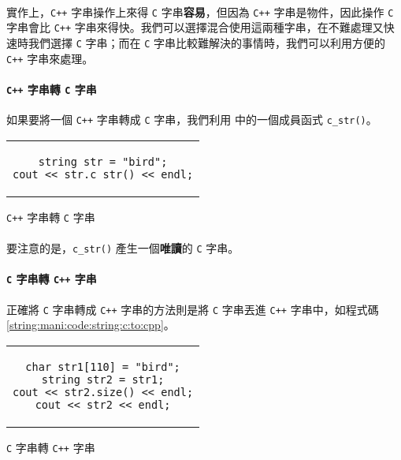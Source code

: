 \documentclass[12pt,a4paper,oneside]{article}
\begin{document}
\begin{CJK}{UTF8}{bkai}
\paragraph{}實作上，\texttt{C++} 字串操作上來得 \texttt{C} 字串\textbf{容易}，但因為 \texttt{C++} 字串是物件，因此操作 \texttt{C} 字串會比 \texttt{C++} 字串來得快。我們可以選擇混合使用這兩種字串，在不難處理又快速時我們選擇 \texttt{C} 字串；而在 \texttt{C} 字串比較難解決的事情時，我們可以利用方便的 \texttt{C++} 字串來處理。

\paragraph{\texttt{C++} 字串轉 \texttt{C} 字串}如果要將一個 \texttt{C++} 字串轉成 \texttt{C} 字串，我們利用  中的一個成員函式 \lstinline!c_str()!。

\begin{code}[h!]
  \centering
  \begin{tabular}{c}
  \begin{lstlisting}
string str = "bird";
cout << str.c_str() << endl;
  \end{lstlisting}
  \end{tabular}
  \caption{\texttt{C++} 字串轉 \texttt{C} 字串}
  \label{string:mani:code:string:cpp:to:c}
\end{code}

\paragraph{}要注意的是，\lstinline!c_str()! 產生一個\textbf{唯讀}的 \texttt{C} 字串。
\paragraph{\texttt{C} 字串轉 \texttt{C++} 字串}正確將 \texttt{C} 字串轉成 \texttt{C++} 字串的方法則是將 \texttt{C} 字串丟進 \texttt{C++} 字串中，如程式碼 \ref{string:mani:code:string:c:to:cpp}。

\begin{code}[h!]
  \centering
  \begin{tabular}{c}
  \begin{lstlisting}
char str1[110] = "bird";
string str2 = str1;
cout << str2.size() << endl;
cout << str2 << endl;
  \end{lstlisting}
  \end{tabular}
  \caption{\texttt{C} 字串轉 \texttt{C++} 字串}
  \label{string:mani:code:string:c:to:cpp}
\end{code}


\end{CJK}
\end{document}
